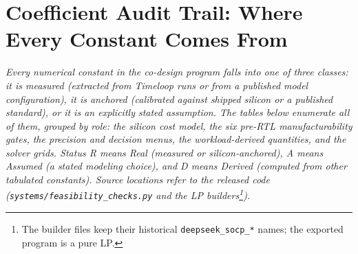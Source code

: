 \section{Coefficient Audit Trail: Where Every Constant Comes From}
\label{app:coeff_provenance}

\emph{Every numerical constant in the co-design program falls into one of
three classes: it is measured (extracted from Timeloop runs or from a
published model configuration), it is anchored (calibrated against shipped
silicon or a published standard), or it is an explicitly stated assumption.
The tables below enumerate all of them, grouped by role: the silicon cost
model, the six pre-RTL manufacturability gates, the precision and decision
menus, the workload-derived quantities, and the solver grids. Status R
means Real (measured or silicon-anchored), A means Assumed (a stated
modeling choice), and D means Derived (computed from other tabulated
constants). Source locations refer to the released code
(\texttt{systems/feasibility\_checks.py} and the LP builders\footnote{The builder files keep their historical \texttt{deepseek\_socp\_*} names; the exported program is a pure LP.}).}

